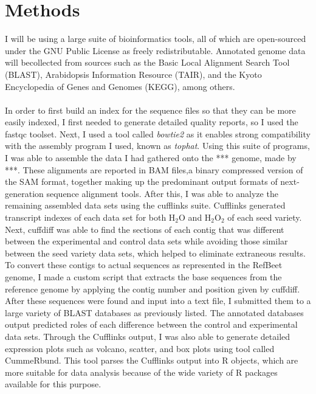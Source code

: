 \documentclass{article}
\begin{document}
\section{Methods}
	I will be using a large suite of bioinformatics tools, all of which are open-sourced under the GNU Public License as freely redistributable. Annotated genome data will becollected from sources such as the Basic Local Alignment Search Tool (BLAST), Arabidopsis Information Resource (TAIR), and the Kyoto Encyclopedia of Genes and Genomes (KEGG), among others.\\\\
	In order to first build an index for the sequence files so that they can be more easily indexed, I first needed to generate detailed quality reports, so I used the fastqc toolset. Next, I used a tool called \emph{bowtie2} as it enables strong compatibility with the assembly program I used, known as \emph{tophat}. Using this suite of programs, I was able to assemble the data I had gathered onto the *** genome, made by ***. These alignments are reported in BAM  files,a binary compressed version of the SAM format, together making up the predominant output formats of next-generation sequence alignment tools. After this, I was able to analyze the remaining assembled data sets using the cufflinks suite. Cufflinks generated transcript indexes of each data set for both H$_{2}$O and H$_{2}$O$_{2}$ of each seed variety. Next, cuffdiff was able to find the sections of each contig that was different between the experimental and control data sets while avoiding those similar between the seed variety data sets, which helped to eliminate extraneous results. To convert these contigs to actual sequences as represented in the RefBeet genome, I made a custom script that extracts the base sequences from the reference genome by applying the contig number and position given by cuffdiff. After these sequences were found and input into a text file, I submitted them to a large variety of BLAST databases as previously listed. The annotated databases output predicted roles of each difference between the control and experimental data sets. Through the Cufflinks output, I was also able to generate detailed expression plots such as volcano, scatter, and box plots using tool called CummeRbund. This tool parses the Cufflinks output into R objects, which are more suitable for data analysis because of the wide variety of R packages available for this purpose.
\end{document}
